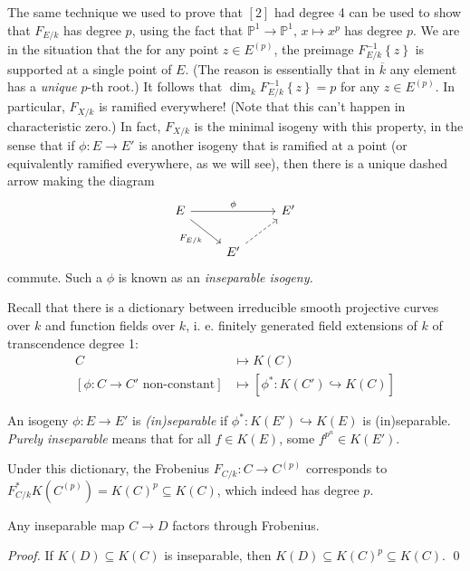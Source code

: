 \begin{example}
The same technique we used to prove that \( [2] \) had degree 4 can be used to show that \( F_{E/k} \) has degree \( p \), using the fact that \( \mathbb{P}^1 \to \mathbb{P}^1 , \, x \mapsto x^p \) has degree \( p \).
We are in the situation that the for any point \( z \in E^{(p)} \), the preimage \( F_{E/k}^{-1} \left\lbrace z \right\rbrace \) is supported at a single point of \( E \).
(The reason is essentially that in \( \overline{k} \) any element has a \textit{unique} \( p \)-th root.)
It follows that \( \operatorname{dim}_k F_{E/k}^{-1} \left\lbrace z \right\rbrace = p \) for any \( z \in E^{(p)} \).
In particular, \( F_{X/k} \) is ramified everywhere!
(Note that this can't happen in characteristic zero.)
In fact, \( F_{X/k} \) is the minimal isogeny with this property, in the sense that if \( \phi \colon E \to E' \) is another isogeny that is ramified at a point (or equivalently ramified everywhere, as we will see), then there is a unique dashed arrow making the diagram
\[
\begin{tikzcd}
  E \arrow[rr,"\phi"] \arrow[dr,"F_{E/k}"'] & & E' \\
  & E' \arrow[ur,dashed] &
\end{tikzcd}
\]
commute. Such a \( \phi \) is known as an \textit{inseparable isogeny.}
\end{example}
Recall that there is a dictionary between irreducible smooth projective curves over \( k \) and function fields over \( k \), i. e. finitely generated field extensions of \( k \) of transcendence degree 1:
\begin{align*}
  C & \mapsto K(C) \\
  \left[ \phi \colon C \to C' \text{ non-constant} \right] & \mapsto \left[ \phi^* \colon K(C') \hookrightarrow K(C) \right]
\end{align*}
\begin{definition}
  An isogeny \( \phi \colon E \to E' \) is \textit{(in)separable} if \( \phi^* \colon K(E') \hookrightarrow K(E) \) is (in)separable.
  \textit{Purely inseparable} means that for all \( f \in K(E) \), some \( f^{p^n} \in K(E') \).
\end{definition}
Under this dictionary, the Frobenius \( F_{C/k} \colon C \to C^{(p)} \) corresponds to \( F_{C/k}^* K(C^{(p)}) = K(C)^p \subseteq K(C) \), which indeed has degree \( p \).
\begin{corollary}
  Any inseparable map \( C\to D \) factors through Frobenius.
\end{corollary}
\textit{Proof.} If \( K(D) \subseteq K(C) \) is inseparable, then \( K(D) \subseteq K(C)^p \subseteq K(C) \). \qed

